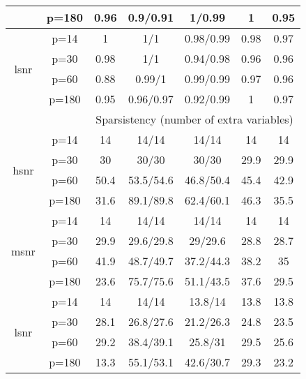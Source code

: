 \begin{table}[ht]
{\begin{tabular}{|c|c|ccccc|}
   & p=180 & 0.96 & 0.9/0.91 & 1/0.99 & 1 & 0.95 \\ 
  \midrule\multirow{4}[2]{*}{lsnr} & p=14 & 1 & 1/1 & 0.98/0.99 & 0.98 & 0.97 \\ 
   & p=30 & 0.98 & 1/1 & 0.94/0.98 & 0.96 & 0.96 \\ 
   & p=60 & 0.88 & 0.99/1 & 0.99/0.99 & 0.97 & 0.96 \\ 
   & p=180 & 0.95 & 0.96/0.97 & 0.92/0.99 & 1 & 0.97 \\ 
   \midrule 
 \multicolumn{1}{|c}{} &       & \multicolumn{5}{c|}{Sparsistency (number of extra variables)} \\
\midrule\multirow{4}[2]{*}{hsnr} & p=14 & 14 & 14/14 & 14/14 & 14 & 14 \\ 
   & p=30 & 30 & 30/30 & 30/30 & 29.9 & 29.9 \\ 
   & p=60 & 50.4 & 53.5/54.6 & 46.8/50.4 & 45.4 & 42.9 \\ 
   & p=180 & 31.6 & 89.1/89.8 & 62.4/60.1 & 46.3 & 35.5 \\ 
  \midrule\multirow{4}[2]{*}{msnr} & p=14 & 14 & 14/14 & 14/14 & 14 & 14 \\ 
   & p=30 & 29.9 & 29.6/29.8 & 29/29.6 & 28.8 & 28.7 \\ 
   & p=60 & 41.9 & 48.7/49.7 & 37.2/44.3 & 38.2 & 35 \\ 
   & p=180 & 23.6 & 75.7/75.6 & 51.1/43.5 & 37.6 & 29.5 \\ 
  \midrule\multirow{4}[2]{*}{lsnr} & p=14 & 14 & 14/14 & 13.8/14 & 13.8 & 13.8 \\ 
   & p=30 & 28.1 & 26.8/27.6 & 21.2/26.3 & 24.8 & 23.5 \\ 
   & p=60 & 29.2 & 38.4/39.1 & 25.8/31 & 29.5 & 25.6 \\ 
   & p=180 & 13.3 & 55.1/53.1 & 42.6/30.7 & 29.3 & 23.2 \\ 
   \bottomrule 
\end{tabular}
}
\end{table}
